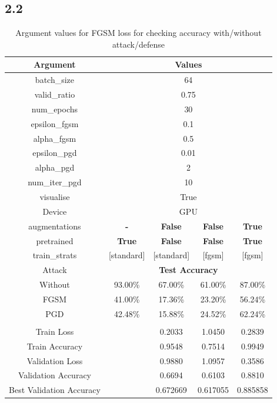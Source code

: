 \documentclass{article}
\begin{document}
\subsection*{2.2}

\begin{table}[H]
    \centering
    \begin{tabular}{|c|cccc|}
    \hline
    \textbf{Argument} & \multicolumn{4}{|c|}{\textbf{Values}} \\
    \hline
    batch\_size &       \multicolumn{4}{c|}{64} \\
    valid\_ratio &      \multicolumn{4}{c|}{0.75} \\
    num\_epochs &       \multicolumn{4}{c|}{30} \\
    epsilon\_fgsm &     \multicolumn{4}{c|}{0.1} \\
    alpha\_fgsm &       \multicolumn{4}{c|}{0.5} \\
    epsilon\_pgd &      \multicolumn{4}{c|}{0.01} \\
    alpha\_pgd &        \multicolumn{4}{c|}{2} \\
    num\_iter\_pgd &    \multicolumn{4}{c|}{10} \\
    visualise &         \multicolumn{4}{c|}{True} \\
    Device &            \multicolumn{4}{c|}{GPU} \\
    augmentations & \textbf{-}  & \textbf{False} & \textbf{False} & \textbf{True} \\
    pretrained & \textbf{True}  & \textbf{False} & \textbf{False} & \textbf{True} \\
    train\_strats & [standard] & [standard] & [fgsm] & [fgsm] \\
    \hline
    Attack & \multicolumn{4}{c|}{\textbf{Test Accuracy}}\\
    \hline
    Without & 93.00\% & 67.00\% & 61.00\% & 87.00\%\\
    FGSM & 41.00\% & 17.36\% & 23.20\% & 56.24\% \\
    PGD & 42.48\% &15.88\%& 24.52\% & 62.24\% \\
    \hline
    \multicolumn{5}{|c|}{\textbf{}}\\
    \hline
    Train Loss & &0.2033 & 1.0450 & 0.2839 \\
    Train Accuracy & &0.9548 & 0.7514 & 0.9949 \\
    Validation Loss & &0.9880 & 1.0957 & 0.3586 \\
    Validation Accuracy & &0.6694 & 0.6103 & 0.8810 \\
    Best Validation Accuracy & &0.672669 & 0.617055 & 0.885858 \\
    \hline
    \end{tabular}
    \caption{Argument values for FGSM loss for checking accuracy with/without attack/defense}
\end{table}
\end{document}
